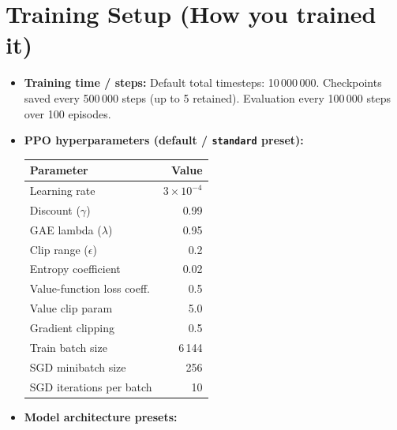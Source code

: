 \documentclass[11pt, a4paper]{article}
\begin{document}
\section{Training Setup (How you trained it)}
\begin{itemize}
    \item \textbf{Training time / steps:}
        Default total timesteps: 10\,000\,000. Checkpoints saved every 500\,000 steps (up to 5 retained). Evaluation every 100\,000 steps over 100 episodes.

    \item \textbf{PPO hyperparameters (default / \texttt{standard} preset):}

        \begin{center}
        \small
        \begin{tabularx}{0.85\textwidth}{l r}
            \toprule
            \textbf{Parameter} & \textbf{Value} \\
            \midrule
            Learning rate          & $3 \times 10^{-4}$ \\
            Discount ($\gamma$)    & 0.99 \\
            GAE lambda ($\lambda$) & 0.95 \\
            Clip range ($\epsilon$)& 0.2 \\
            Entropy coefficient    & 0.02 \\
            Value-function loss coeff. & 0.5 \\
            Value clip param       & 5.0 \\
            Gradient clipping      & 0.5 \\
            Train batch size       & 6\,144 \\
            SGD minibatch size     & 256 \\
            SGD iterations per batch & 10 \\
            \bottomrule
        \end{tabularx}
        \end{center}

    \item \textbf{Model architecture presets:}


\end{itemize}
\end{document}

